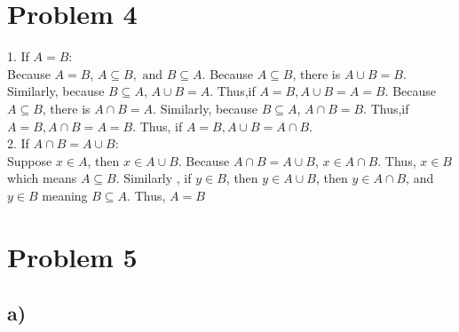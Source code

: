 \documentclass[a4paper,fleqn]{article}
\begin{document}
\section*{Problem 4}
    1. If \(A=B\):\\ 
    Because \(A=B\), \(A \subseteq B, \text{ and }B\subseteq A\). Because \(A\subseteq B\), there is \(A\cup B = B\). Similarly, 
    because \(B\subseteq A\), \(A\cup B = A\). Thus,if \( A=B, A\cup B = A = B\). Because \(A\subseteq B\), there is \(A\cap B = A\). Similarly, 
    because \(B\subseteq A\), \(A\cap B = B\). Thus,if \( A=B, A\cap B = A = B\). Thus, if \( A=B, A\cup B = A\cap B\).
    \\2. If \(A\cap B = A\cup B\):\\
    Suppose \(x\in A\), then \(x\in A\cup B\). Because \(A\cap B = A\cup B\), \(x\in A\cap B\). Thus, \(x\in B\) which means 
    \(A \subseteq B\). Similarly , if \(y\in B\), then \(y\in A\cup B\), then \(y\in A\cap B\), and \(y\in B\) meaning \(B\subseteq A\). Thus, \(A=B\)
\section*{Problem 5}
    \subsection*{a)}
\end{document}
